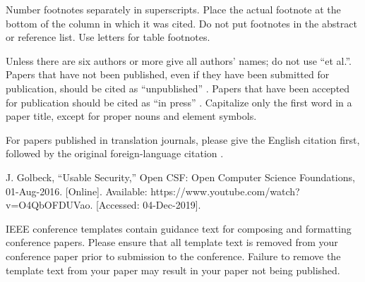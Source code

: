 \documentclass[conference]{IEEEtran}
\begin{document}
Number footnotes separately in superscripts. Place the actual footnote at 
the bottom of the column in which it was cited. Do not put footnotes in the 
abstract or reference list. Use letters for table footnotes.

Unless there are six authors or more give all authors' names; do not use 
``et al.''. Papers that have not been published, even if they have been 
submitted for publication, should be cited as ``unpublished'' \cite{b4}. Papers 
that have been accepted for publication should be cited as ``in press'' \cite{b5}. 
Capitalize only the first word in a paper title, except for proper nouns and 
element symbols.

For papers published in translation journals, please give the English 
citation first, followed by the original foreign-language citation \cite{b6}.

\begin{thebibliography}{00}
J. Golbeck, “Usable Security,” Open CSF: Open Computer Science Foundations, 01-Aug-2016. [Online]. Available: https://www.youtube.com/watch?v=O4QbOFDUVao. [Accessed: 04-Dec-2019].

\end{thebibliography}
\vspace{12pt}
\color{red}
IEEE conference templates contain guidance text for composing and formatting conference papers. Please ensure that all template text is removed from your conference paper prior to submission to the conference. Failure to remove the template text from your paper may result in your paper not being published.
\end{document}
